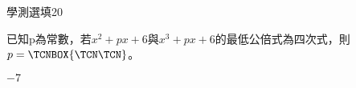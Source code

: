 \begin{QUESTIONS}
    \begin{QUESTION}
        \begin{ExamInfo}{83}{學測}{選填}{20}
        \end{ExamInfo}
        \begin{ExamAnsRateInfo}{}{}{}{}
        \end{ExamAnsRateInfo}
        \begin{QBODY}
            	已知p為常數，若${{x}^{2}}+px+6$與${{x}^{3}}+px+6$的最低公倍式為四次式，則$p=\TCNBOX{\TCN\TCN}$。
        \end{QBODY}
        \begin{QFROMS}
        \end{QFROMS}
        \begin{QTAGS}\end{QTAGS}
        \begin{QANS}
            $-7$
        \end{QANS}
        \begin{QSOLLIST}
        \end{QSOLLIST}
        \begin{QEMPTYSPACE}
        \end{QEMPTYSPACE}
    \end{QUESTION}
\end{QUESTIONS}
